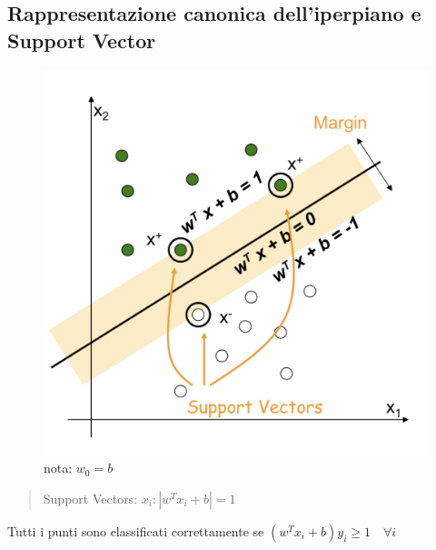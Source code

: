 \documentclass{article}
\begin{document}
\subsection{Rappresentazione canonica dell'iperpiano e Support Vector}
\begin{figure}[H]
\centering
\includegraphics[scale=0.4]{Images/svmmargincanonical.png}
\caption{nota: $w_0=b$}
\end{figure}
\begin{quote}
    Support Vectors: $x_i : |w^Tx_i+b|=1$
\end{quote}
Tutti i punti sono classificati correttamente se $(w^Tx_i+b)y_i \geq 1 \quad \forall i$
\clearpage
\end{document}
